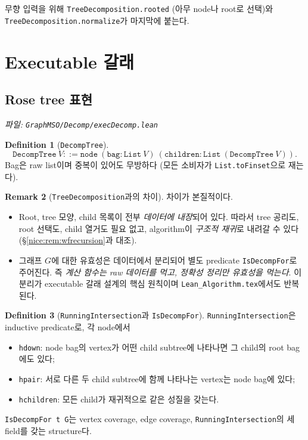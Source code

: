 \documentclass[11pt]{article}
\theoremstyle{definition}
\newtheorem{definition}{Definition}[section]
\newtheorem{remark}[definition]{Remark}
\theoremstyle{plain}
\newcommand{\lean}[1]{\texttt{#1}}
\newcommand{\leanfile}[1]{\texttt{#1}}
\begin{document}
무향 입력을 위해 \lean{TreeDecomposition.rooted} (아무 node나 root로 선택)와
\lean{TreeDecomposition.normalize}가 마지막에 붙는다.

\section{Executable 갈래}
\label{nice:sec:exec}

\subsection{Rose tree 표현}

\emph{파일: \leanfile{GraphMSO/Decomp/execDecomp.lean}}

\begin{definition}[\lean{DecompTree}]
\label{nice:def:decomptree}
\[
  \lean{DecompTree}\ V ::= \lean{node}\ (\lean{bag} : \lean{List}\ V)\ (\lean{children} : \lean{List}\ (\lean{DecompTree}\ V)).
\]
Bag은 raw list이며 중복이 있어도 무방하다 (모든 소비자가
\lean{List.toFinset}으로 재는다).
\end{definition}

\begin{remark}[\lean{TreeDecomposition}과의 차이]
\label{nice:rem:rosevsmath}
차이가 본질적이다.
\begin{itemize}
  \item Root, tree 모양, child 목록이 전부 \emph{데이터에 내장}되어 있다.
    따라서 tree 공리도, root 선택도, child 열거도 필요 없고, algorithm이
    \emph{구조적 재귀}로 내려갈 수 있다 (\S\ref{nice:rem:wfrecursion}과 대조).
  \item 그래프 $G$에 대한 유효성은 데이터에서 분리되어 별도 predicate
    \lean{IsDecompFor}로 주어진다. 즉 \emph{계산 함수는 raw 데이터를 먹고,
    정확성 정리만 유효성을 먹는다}. 이 분리가 executable 갈래 설계의 핵심
    원칙이며 \leanfile{Lean\_Algorithm.tex}에서도 반복된다.
\end{itemize}
\end{remark}

\begin{definition}[\lean{RunningIntersection}과 \lean{IsDecompFor}]
\label{nice:def:isdecompfor}
\lean{RunningIntersection}은 inductive predicate로, 각 node에서
\begin{itemize}
  \item \lean{hdown}: node bag의 vertex가 어떤 child subtree에 나타나면 그
    child의 root bag에도 있다;
  \item \lean{hpair}: 서로 다른 두 child subtree에 함께 나타나는 vertex는 node
    bag에 있다;
  \item \lean{hchildren}: 모든 child가 재귀적으로 같은 성질을 갖는다.
\end{itemize}
\lean{IsDecompFor t G}는 vertex coverage, edge coverage,
\lean{RunningIntersection}의 세 field를 갖는 structure다.
\end{definition}
\end{document}
